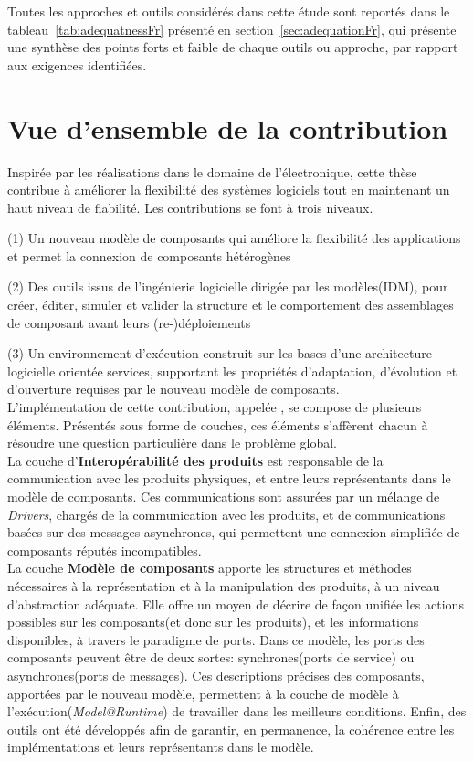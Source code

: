 Toutes les approches et outils considérés dans cette étude sont reportés dans le tableau~\ref{tab:adequatnessFr} présenté en section~\ref{sec:adequationFr}, qui présente une synthèse des points forts et faible de chaque outils ou approche, par rapport aux exigences identifiées.


\section{Vue d'ensemble de la contribution}

Inspirée par les réalisations dans le domaine de l'électronique, cette thèse contribue à améliorer la flexibilité des systèmes logiciels tout en maintenant un haut niveau de fiabilité. Les contributions se font à trois niveaux.

\par (1) Un nouveau modèle de composants qui améliore la flexibilité des applications et permet la connexion de composants hétérogènes
\par (2) Des outils issus de l'ingénierie logicielle dirigée par les modèles(IDM), pour créer, éditer, simuler et valider la structure et le comportement des assemblages de composant avant leurs (re-)déploiements
\par (3) Un environnement d'exécution construit sur les bases d'une architecture logicielle orientée services, supportant les propriétés d'adaptation, d'évolution et d'ouverture requises par le nouveau modèle de composants.\\

L'implémentation de cette contribution, appelée \enti{}, se compose de plusieurs éléments. Présentés sous forme de couches, ces éléments s'affèrent chacun à résoudre une question particulière dans le problème global.\\

La couche d'{\bf Interopérabilité des produits} est responsable de la communication avec les produits physiques, et entre leurs représentants dans le modèle de composants. Ces communications sont assurées par un mélange de {\it Drivers}, chargés de la communication avec les produits, et de communications basées sur des messages asynchrones, qui permettent une connexion simplifiée de composants réputés incompatibles.\\

La couche {\bf Modèle de composants} apporte les structures et méthodes nécessaires à la représentation et à la manipulation des produits, à un niveau d'abstraction adéquate. Elle offre un moyen de décrire de façon unifiée les actions possibles sur les composants(et donc sur les produits), et les informations disponibles, à travers le paradigme de ports. Dans ce modèle, les ports des composants peuvent être de deux sortes: synchrones(ports de service) ou asynchrones(ports de messages). Ces descriptions précises des composants, apportées par le nouveau modèle, permettent à la couche de modèle à l'exécution({\it Model@Runtime}) de travailler dans les meilleurs conditions. Enfin, des outils ont été développés afin de garantir, en permanence, la cohérence entre les implémentations et leurs représentants dans le modèle.\\

